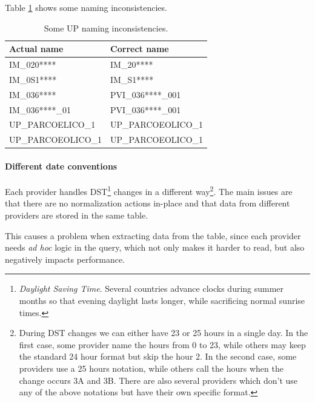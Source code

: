         Table \ref{tab:sbil:up_names} shows some naming inconsistencies.
        
        \begin{table}
            \centering
            \begin{tabular}{|l l|}
                \toprule
                Actual name         & Correct name      \\
                \midrule
                IM\_020****         & IM\_20****        \\
                IM\_0S1****         & IM\_S1****        \\
                \midrule
                IM\_036****         & PVI\_036****\_001 \\
                IM\_036****\_01     & PVI\_036****\_001 \\
                \midrule
                UP\_PARCOELICO\_1    & UP\_PARCOEOLICO\_1 \\
                UP\_PARCOEOLICO\_1   & UP\_PARCOEOLICO\_1 \\
                \bottomrule
            \end{tabular}
            \caption{Some UP naming inconsistencies.}
            \label{tab:sbil:up_names}
        \end{table}

    \paragraph{Different date conventions}
        Each provider handles DST\footnote{
            \textit{Daylight Saving Time}.
             Several countries advance clocks during summer months so that evening daylight lasts longer, while sacrificing normal sunrise times.
        } changes in a different way\footnote{
            During DST changes we can either have 23 or 25 hours in a single day.
            In the first case, some provider name the hours from 0 to 23, while others may keep the standard 24 hour format but skip the hour 2.
            In the second case, some providers use a 25 hours notation, while others call the hours when the change occurs 3A and 3B.
            There are also several providers which don't use any of the above notations but have their own specific format.
        }.
        The main issues are that there are no normalization actions in-place and that data from different providers are stored in the same table.
        
        This causes a problem when extracting data from the table, since each provider needs \textit{ad hoc} logic in the query, which not only makes it harder to read, but also negatively impacts performance.
        
